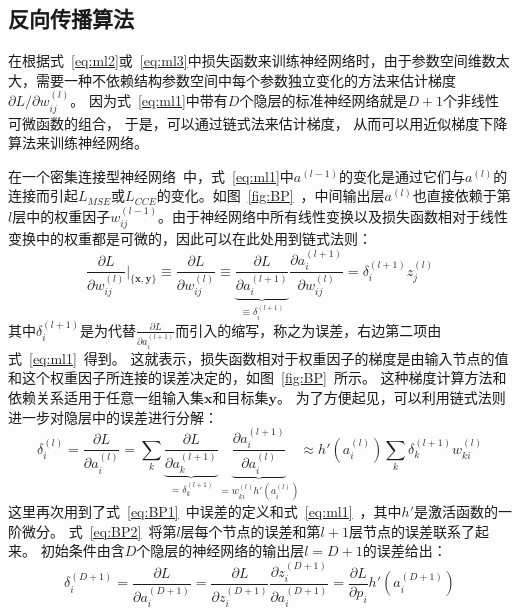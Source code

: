 \subsection{反向传播算法}
\label{sec:BackProp}

在根据式~\ref{eq:ml2}或~\ref{eq:ml3}中损失函数来训练神经网络时，由于参数空间维数太大，需要一种不依赖结构参数空间中每个参数独立变化的方法来估计梯度$\partial L / \partial w_{ij}^{(l)}$。
因为式~\ref{eq:ml1}中带有$D$个隐层的标准神经网络就是$D+1$个非线性可微函数的组合，
于是，可以通过链式法来估计梯度，
从而可以用近似梯度下降算法来训练神经网络。

在一个密集连接型神经网络~\cite{DenNet}中，式~\ref{eq:ml1}中$a^{(l-1)}$的变化是通过它们与$a^{(l)}$的连接而引起$L_{MSE}$或$L_{CCE}$的变化。如图~\ref{fig:BP}~，中间输出层$a^{(l)}$也直接依赖于第$l$层中的权重因子$w_{ij}^{(l-1)}$。由于神经网络中所有线性变换以及损失函数相对于线性变换中的权重都是可微的，因此可以在此处用到链式法则：
\begin{equation} 
\label{eq:BP1}	
\frac{\partial L}{\partial w_{ij}^{(l)}} \bigg\rvert_{\{\boldsymbol{x},\boldsymbol{y}\}} \equiv \frac{\partial L}{\partial w_{ij}^{(l)}} \equiv \underbrace{\frac{\partial L}{\partial a_{i}^{(l+1)}}}_{\equiv \delta_{i}^{(l+1)}} \frac{\partial a_{i}^{(l+1)}}{\partial w_{ij}^{(l)}} = \delta_{i}^{(l+1)}z_{j}^{(l)}
\end{equation}
其中$\delta_{i}^{(l+1)}$是为代替$\frac{\partial L}{\partial a_{i}^{(l+1)}}$而引入的缩写，称之为误差，右边第二项由式~\ref{eq:ml1}~得到。
这就表示，损失函数相对于权重因子的梯度是由输入节点的值和这个权重因子所连接的误差决定的，如图~\ref{fig:BP}~所示。
这种梯度计算方法和依赖关系适用于任意一组输入集$\boldsymbol{x}$和目标集$\boldsymbol{y}$。
为了方便起见，可以利用链式法则进一步对隐层中的误差进行分解：
\begin{equation} 
\label{eq:BP2}	
\delta_{i}^{(l)}=\frac{\partial L}{\partial a_{i}^{(l)}}=\sum_k \underbrace{\frac{\partial L}{\partial a_{k}^{(l+1)}}}_{= \delta_{k}^{(l+1)}} \underbrace{\frac{\partial a_{i}^{(l+1)}}{\partial a_{i}^{(l)}}}_{= w_{ki}^{(l)}h' \left( a_{i}^{(l)} \right) } \approx h' \left( a_{i}^{(l)} \right) \sum_k \delta_{k}^{(l+1)} w_{ki}^{(l)}
\end{equation}
这里再次用到了式~\ref{eq:BP1}~中误差的定义和式~\ref{eq:ml1}~，其中$h'$是激活函数的一阶微分。
式~\ref{eq:BP2}~将第$l$层每个节点的误差和第$l+1$层节点的误差联系了起来。
初始条件由含$D$个隐层的神经网络的输出层$l=D+1$的误差给出：
\begin{equation} 
\label{eq:BP3}	
\delta_{i}^{(D+1)}=\frac{\partial L}{\partial a_{i}^{(D+1)}}= \frac{\partial L}{\partial z_{i}^{(D+1)}} \frac{\partial z_{i}^{(D+1)}}{\partial a_{i}^{(D+1)}} = \frac{\partial L}{\partial p_{i}} h' \left( a_{i}^{(D+1)} \right)
\end{equation}
